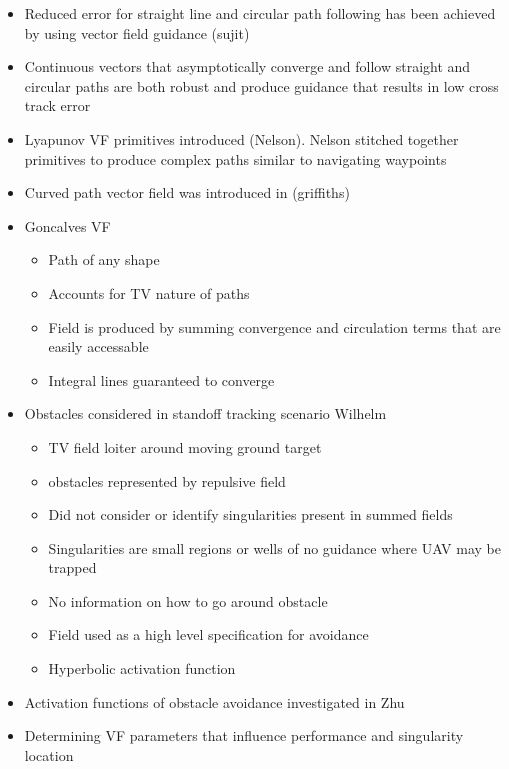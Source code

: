 \documentclass[conf]{new-aiaa}
\begin{document}
\begin{itemize}
	\item Reduced error for straight line and circular path following has been achieved by using vector field guidance (sujit)
	\item Continuous vectors that asymptotically converge and follow straight and circular paths are both robust and produce guidance that results in low cross track error
	\item Lyapunov VF primitives introduced (Nelson). Nelson stitched together primitives to produce complex paths similar to navigating waypoints
	\item Curved path vector field was introduced in (griffiths)
	\item Goncalves VF
	\begin{itemize}
		\item Path of any shape
		\item Accounts for TV nature of paths
		\item Field is produced by summing convergence and circulation terms that are easily accessable
		\item Integral lines guaranteed to converge
	\end{itemize}
	\item Obstacles considered in standoff tracking scenario Wilhelm
	\begin{itemize}
		\item TV field loiter around moving ground target
		\item obstacles represented by repulsive field 
		\item Did not consider or identify singularities present in summed fields
		\item Singularities are small regions or wells of no guidance where UAV may be trapped
		\item No information on how to go around obstacle
		\item Field used as a high level specification for avoidance
		\item Hyperbolic activation function
	\end{itemize} 

	\item Activation functions of obstacle avoidance investigated in Zhu
	\item Determining VF parameters that influence performance and singularity location 
\end{itemize}
\end{document}
